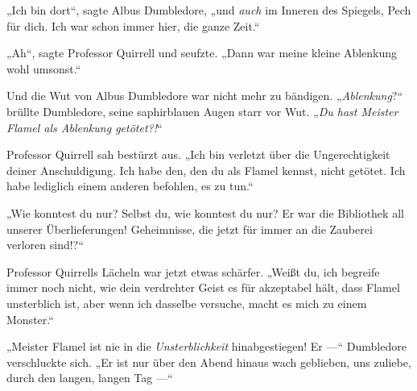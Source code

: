 „Ich bin dort“, sagte Albus Dumbledore, „und \emph{auch} im Inneren des Spiegels, Pech für dich. Ich war schon immer hier, die ganze Zeit.“

„Ah“, sagte Professor Quirrell und seufzte.
„Dann war meine kleine Ablenkung wohl umsonst.“

Und die Wut von Albus Dumbledore war nicht mehr zu bändigen.
„\emph{Ablenkung}?“ brüllte Dumbledore, seine saphirblauen Augen starr vor Wut.
„\emph{Du hast Meister Flamel als Ablenkung getötet?!}“

Professor Quirrell sah bestürzt aus.
„Ich bin verletzt über die Ungerechtigkeit deiner Anschuldigung. Ich habe den, den du als Flamel kennst, nicht getötet. Ich habe lediglich einem anderen befohlen, es zu tun.“

„Wie konntest du nur? Selbst du, wie konntest du nur? Er war die Bibliothek all unserer Überlieferungen! Geheimnisse, die jetzt für immer an die Zauberei verloren sind!?“

Professor Quirrells Lächeln war jetzt etwas schärfer.
„Weißt du, ich begreife immer noch nicht, wie dein verdrehter Geist es für akzeptabel hält, dass Flamel unsterblich ist, aber wenn ich dasselbe versuche, macht es mich zu einem Monster.“

„Meister Flamel ist nie in die \emph{Unsterblichkeit} hinabgestiegen! Er —“ Dumbledore verschluckte sich.
„Er ist nur über den Abend hinaus wach geblieben, uns zuliebe, durch den langen, langen Tag —“

